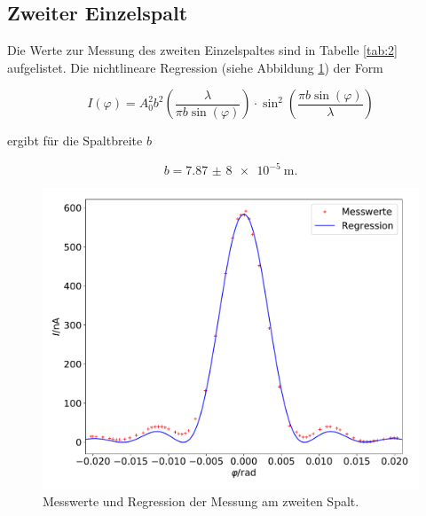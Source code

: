 \subsection{Zweiter Einzelspalt}

Die Werte zur Messung des zweiten Einzelspaltes sind in Tabelle \ref{tab:2} aufgelistet. Die nichtlineare Regression (siehe Abbildung \ref{plot:2}) der Form

\begin{equation}
  I(\varphi) = A_0^2 b^2 \left( \frac{\lambda}{\pi b \sin(\varphi)} \right) \cdot \sin^2 \left( \frac{\pi b \sin(\varphi)}{\lambda} \right)
\end{equation}

ergibt für die Spaltbreite $b$

\begin{equation*}
  b = \SI{7,87(8)e-5}{\meter} .
\end{equation*}

\begin{figure}
  \centering
  \includegraphics[scale = 0.5]{einzel2.pdf}
  \caption{Messwerte und Regression der Messung am zweiten Spalt.}
  \label{plot:2}
\end{figure}

